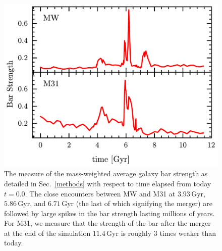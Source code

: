 \documentclass[twocolumn]{aastex631}
\DeclareRobustCommand{\Secref}[1]{Sec.~\ref{#1}}
\begin{document}
\begin{figure}[H]
  \centering
  \includegraphics[width=\columnwidth]{bar_strength}
  \caption{The measure of the mass-weighted average galaxy bar
    strength as detailed in \Secref{methods} with respect to time
    elapsed from today $t=0.0$. The close encounters between MW and
    M31 at $3.93\,\mathrm{Gyr}$, $5.86\,\mathrm{Gyr}$, and $6.71\,\mathrm{Gyr}$
    (the last of which signifying the merger) are followed by large
    spikes in the bar strength lasting millions of years. For M31, we
    measure that the strength of the bar after the merger at the end
    of the simulation $11.4\,\mathrm{Gyr}$ is roughly 3 times weaker than
    today.}
  \label{fig:galaxy}
\end{figure}


\end{document}
